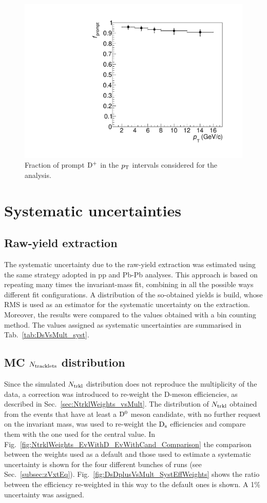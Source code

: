 \begin{figure}[htpb]
\centering
 \includegraphics[width=.7\textwidth]{FigCap6/DplusFprompt_Nb_d0cut_1_200.pdf}
  \caption{Fraction of prompt ${\rm D^+}$ in the $p_{\rm T}$ intervals considered for the analysis.}
 \label{fig:DplusfPromptVsNtrkl}
\end{figure}

\section {Systematic uncertainties}
\subsection{Raw-yield extraction}
\label{sec:rawYSystpA}
The systematic uncertainty due to the raw-yield extraction was 
estimated using the same strategy adopted in pp and Pb-Pb analyses. 
This approach is based on repeating many times the invariant-mass fit, 
combining in all the possible ways different fit configurations.
A distribution of the so-obtained yields is build, whose RMS is used as an 
estimator for the systematic uncertainty on the extraction.
Moreover, the results were compared to the values obtained with a bin 
counting method. The values assigned as systematic uncertainties are summarised 
in Tab.~\ref{tab:DsVsMult_syst}.

\subsection{MC $N_{\rm tracklets}$ distribution}
\label{sec:NtrkSyst}
Since the simulated $N_{\rm trkl}$ distribution does not reproduce the multiplicity of the data, 
a correction was introduced to re-weight the D-meson efficiencies, as described 
in Sec.~\ref{sec:NtrklWeights_vsMult}. 
The distribution of $N_{\rm trkl}$ obtained from the events that have at 
least a ${\rm D^0}$ meson candidate, with no further request on the invariant mass,
was used to re-weight the ${\rm D_s}$ efficiencies and compare them with the one used for the central value.
In Fig.~\ref{fig:NtrklWeights_EvWithD_EvWithCand_Comparison} 
the comparison between the weights used as a default and those used 
to estimate a systematic uncertainty is shown for the four different 
bunches of runs (see Sec.~\ref{subsec:zVxtEq}).
Fig.~\ref{fig:DsDplusVsMult_SystEffWeights} shows the ratio between 
the efficiency re-weighted in this way to the default ones is shown. A 1\% uncertainty was assigned.

